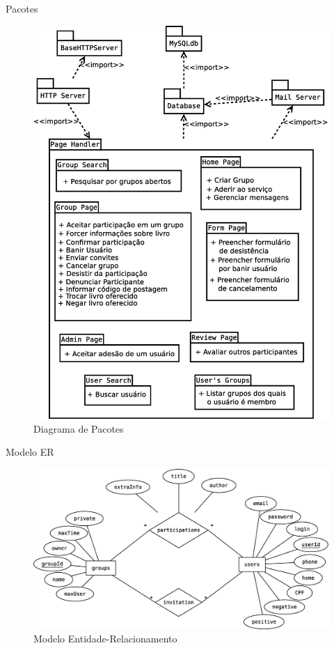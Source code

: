 \documentclass{beamer}
\begin{document}
\begin{frame}{Pacotes}
 \begin{figure}
  \includegraphics[height=0.7\textheight]{pacotes.eps}
  \caption{Diagrama de Pacotes}  
 \end{figure} 
\end{frame}

\begin{frame}{Modelo ER}
 \begin{figure}
  \includegraphics[width=\textwidth]{modeloER.eps}
  \caption{Modelo Entidade-Relacionamento}  
 \end{figure} 
\end{frame}
\end{document}
